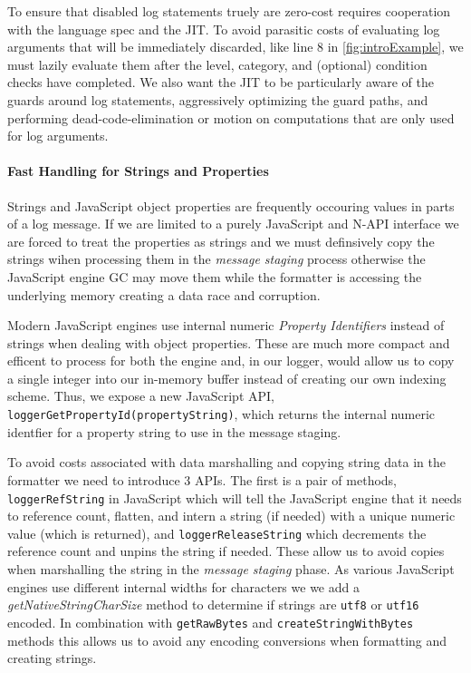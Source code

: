 To ensure that disabled log statements truely are zero-cost requires cooperation 
with the language spec and the JIT. To avoid parasitic costs of evaluating log 
arguments that will be immediately discarded, like line 8 in \autoref{fig:introExample}, 
we must lazily evaluate them after the level, category, and (optional) condition 
checks have completed. We also want the JIT to be particularly aware of the guards 
around log statements, aggressively optimizing the guard paths, and performing 
dead-code-elimination or motion on computations that are only used for log arguments.

\paragraph{Fast Handling for Strings and Properties}
\noindent
Strings and JavaScript object properties are frequently occouring values in 
parts of a log message. If we are limited to a purely JavaScript and N-API 
interface we are forced to treat the properties as strings and we must 
definsively copy the strings wihen processing them in the \emph{message staging} 
process otherwise the JavaScript engine GC may move them while the formatter is 
accessing the underlying memory creating a data race and corruption. 

Modern JavaScript engines use internal numeric \emph{Property Identifiers} 
instead of strings when dealing with object properties. These are much more 
compact and efficent to process for both the engine and, in our logger, would 
allow us to copy a single integer into our in-memory buffer instead of creating 
our own indexing scheme. Thus, we expose a new 
JavaScript API, \texttt{loggerGetPropertyId(propertyString)}, which returns the 
internal numeric identfier for a property string to use in the message staging. 

To avoid costs associated with data marshalling and copying string data 
in the formatter we need to introduce 3 APIs. The first is a pair of 
methods, \texttt{loggerRefString} in JavaScript which will tell the JavaScript 
engine that it needs to reference count, flatten, and intern a string (if needed) 
with a unique numeric value (which is returned), and \texttt{loggerReleaseString} 
which decrements the reference count and unpins the string if needed. These 
allow us to avoid copies when marshalling the string in the \emph{message staging} 
phase. As various JavaScript engines use different internal widths for characters 
we we add a \emph{getNativeStringCharSize} method to determine if strings 
are \texttt{utf8} or \texttt{utf16} encoded. In combination with \texttt{getRawBytes} 
and \texttt{createStringWithBytes} methods this allows us to avoid any encoding 
conversions when formatting and creating strings. 

